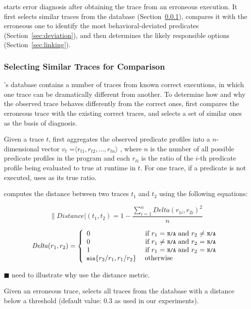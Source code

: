 \ourtool starts error diagnosis after obtaining the trace from
an erroneous execution. It first selects similar
traces from the database (Section~\ref{sec:similar}), compares it with
the erroneous one to identify the most behavioral-deviated predicates
(Section~\ref{sec:deviation}), and then determines
the likely responsible options (Section~\ref{sec:linking}).


\subsubsection{Selecting Similar Traces for Comparison}
\label{sec:similar}

\ourtool's database contains a number of
traces from known correct executions, in which one trace
can be dramatically different from another. To
determine how and why the observed trace behaves
differently from the correct ones, \ourtool first
compares the erroneous trace with the existing
correct traces, and selects a set of similar ones
as the basis of diagnosis.

Given a trace $t$, \ourtool first aggregates
the observed predicate profiles into a $n$-dimensional
vector $v_{t}$ =$\langle r_{t1}, r_{t2}, ..., r_{tn}\rangle$ , where $n$
is the number of all possible predicate profiles in the program
and each $r_{ti}$ is the ratio of the $i$-th predicate profile being evaluated
to true at runtime in $t$. For one trace, if a predicate is not executed,
\ourtool uses  as its true ratio.


\ourtool computes the distance between two traces $t_1$ and $t_2$ using
the following equations:

\[
\|Distance|(t_1, t_2) = 1 - \frac{\sum_{i = 1}^{n}Delta(r_{1i}, r_{2i})^2}{n}
\]

\[
\|Delta|(r_1, r_2) = 
\left\{
\begin{array}{l l l l}
  0 & \ \mbox{if $r_1$ = \CodeIn{N/A} and $r_2$ $\neq$ \CodeIn{N/A}}\\
  0 & \ \mbox{if $r_1$ $\neq$ \CodeIn{N/A} and $r_2$ = \CodeIn{N/A}}\\
  1 & \ \mbox{if $r_1$ = \CodeIn{N/A} and $r_2$ = \CodeIn{N/A}}\\
  \CodeIn{min}\{r_2/r_1, r_1/r_2\} & \; \mbox{otherwise}\\ \end{array} \right.
\]


$\blacksquare$ need to illustrate why use the distance metric.

Given an erroneous trace, \ourtool selects all traces from the database
with a distance below a threshold (default value: 0.3 as used in our
experiments).

